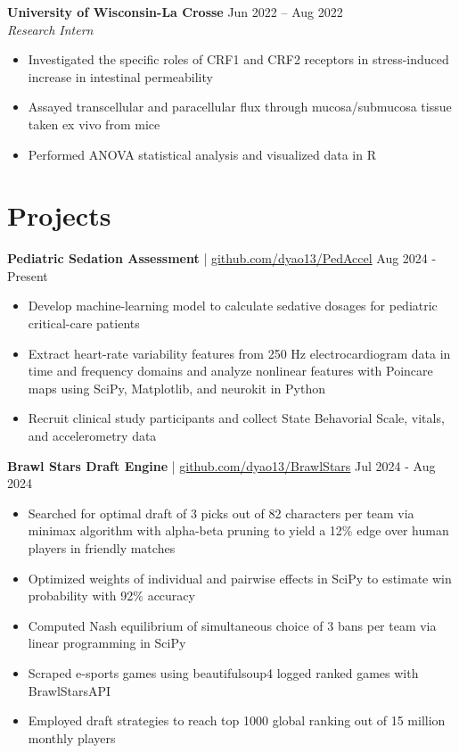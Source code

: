\documentclass[11pt]{article}       %
\begin{document}
\textbf{University of Wisconsin-La Crosse} \hfill Jun 2022 – Aug 2022 \\
\textit{Research Intern} \vspace{-9pt} \\
\begin{itemize}
  \item Investigated the specific roles of CRF1 and CRF2 receptors in stress-induced increase in intestinal permeability
  \item Assayed transcellular and paracellular flux through mucosa/submucosa tissue taken ex vivo from mice
  \item Performed ANOVA statistical analysis and visualized data in R
\end{itemize}

\vspace{-18.5pt}

\section*{Projects}
\textbf{Pediatric Sedation Assessment} | \href{https://github.com/dyao13/PedAccel}{github.com/dyao13/PedAccel} \hfill Aug 2024 - Present \vspace{-9pt} \\
\begin{itemize}
  \item Develop machine-learning model to calculate sedative dosages for pediatric critical-care patients
  \item Extract heart-rate variability features from 250 Hz electrocardiogram data in time and frequency domains and analyze nonlinear features with Poincare maps using SciPy, Matplotlib, and neurokit in Python
  \item Recruit clinical study participants and collect State Behavorial Scale, vitals, and accelerometry data
\end{itemize}

\textbf{Brawl Stars Draft Engine} | \href{https://github.com/dyao13/BrawlStars}{github.com/dyao13/BrawlStars} \hfill Jul 2024 - Aug 2024 \vspace{-9pt} \\
\begin{itemize}
  \item Searched for optimal draft of 3 picks out of 82 characters per team via minimax algorithm with alpha-beta pruning to yield a 12\% edge over human players in friendly matches
  \item Optimized weights of individual and pairwise effects in SciPy to estimate win probability with 92\% accuracy
  \item Computed Nash equilibrium of simultaneous choice of 3 bans per team via linear programming in SciPy
  \item Scraped e-sports games using beautifulsoup4 logged ranked games with BrawlStarsAPI
  \item Employed draft strategies to reach top 1000 global ranking out of 15 million monthly players
\end{itemize}
\end{document}
